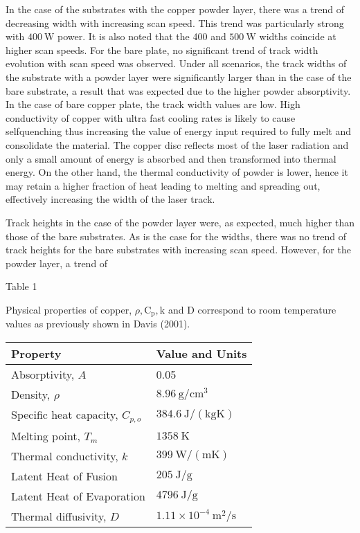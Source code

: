 \documentclass[10pt]{article}
\begin{document}
In the case of the substrates with the copper powder layer, there was a trend of decreasing width with increasing scan speed. This trend was particularly strong with $400 \mathrm{~W}$ power. It is also noted that the 400 and $500 \mathrm{~W}$ widths coincide at higher scan speeds. For the bare plate, no significant trend of track width evolution with scan speed was observed. Under all scenarios, the track widths of the substrate with a powder layer were significantly larger than in the case of the bare substrate, a result that was expected due to the higher powder absorptivity. In the case of bare copper plate, the track width values are low. High conductivity of copper with ultra fast cooling rates is likely to cause selfquenching thus increasing the value of energy input required to fully melt and consolidate the material. The copper disc reflects most of the laser radiation and only a small amount of energy is absorbed and then transformed into thermal energy. On the other hand, the thermal conductivity of powder is lower, hence it may retain a higher fraction of heat leading to melting and spreading out, effectively increasing the width of the laser track.

Track heights in the case of the powder layer were, as expected, much higher than those of the bare substrates. As is the case for the widths, there was no trend of track heights for the bare substrates with increasing scan speed. However, for the powder layer, a trend of

Table 1

Physical properties of copper, $\rho, \mathrm{C}_{\mathrm{p}}, \mathrm{k}$ and $\mathrm{D}$ correspond to room temperature values as previously shown in Davis (2001).

\begin{center}
\begin{tabular}{ll}
\hline
Property & Value and Units \\
\hline
Absorptivity, $A$ & 0.05 \\
Density, $\rho$ & $8.96 \mathrm{~g} / \mathrm{cm}^{3}$ \\
Specific heat capacity, $C_{p, o}$ & $384.6 \mathrm{~J} /(\mathrm{kg} \mathrm{K})$ \\
Melting point, $T_{m}$ & $1358 \mathrm{~K}$ \\
Thermal conductivity, $k$ & $399 \mathrm{~W} /(\mathrm{m} \mathrm{K})$ \\
Latent Heat of Fusion & $205 \mathrm{~J} / \mathrm{g}$ \\
Latent Heat of Evaporation & $4796 \mathrm{~J} / \mathrm{g}$ \\
Thermal diffusivity, $D$ & $1.11 \times 10^{-4} \mathrm{~m}^{2} / \mathrm{s}$ \\
\hline
\end{tabular}
\end{center}
\end{document}
